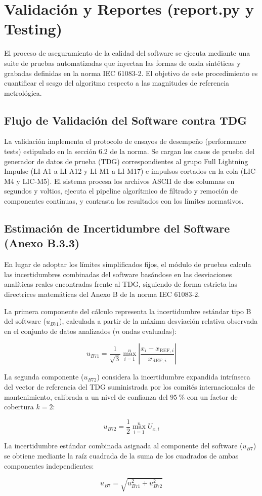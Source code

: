 \section{Validación y Reportes (report.py y Testing)}
El proceso de aseguramiento de la calidad del software se ejecuta mediante una suite de pruebas automatizadas que inyectan las formas de onda sintéticas y grabadas definidas en la norma IEC 61083-2. El objetivo de este procedimiento es cuantificar el sesgo del algoritmo respecto a las magnitudes de referencia metrológica.

\subsection{Flujo de Validación del Software contra TDG}
La validación implementa el protocolo de ensayos de desempeño (performance tests) estipulado en la sección 6.2 de la norma. Se cargan los casos de prueba del generador de datos de prueba (TDG) correspondientes al grupo Full Lightning Impulse (LI-A1 a LI-A12 y LI-M1 a LI-M17) e impulsos cortados en la cola (LIC-M4 y LIC-M5). El sistema procesa los archivos ASCII de dos columnas en segundos y voltios, ejecuta el pipeline algorítmico de filtrado y remoción de componentes continuas, y contrasta los resultados con los límites normativos.

\subsection{Estimación de Incertidumbre del Software (Anexo B.3.3)}
En lugar de adoptar los límites simplificados fijos, el módulo de pruebas calcula las incertidumbres combinadas del software basándose en las desviaciones analíticas reales encontradas frente al TDG, siguiendo de forma estricta las directrices matemáticas del Anexo B de la norma IEC 61083-2.

La primera componente del cálculo representa la incertidumbre estándar tipo B del software ($u_{B71}$), calculada a partir de la máxima desviación relativa observada en el conjunto de datos analizados ($n$ ondas evaluadas):

$$u_{B71} = \frac{1}{\sqrt{3}} \max_{i=1}^{n} \left| \frac{x_i - x_{\text{REF},i}}{x_{\text{REF},i}} \right|$$

La segunda componente ($u_{B72}$) considera la incertidumbre expandida intrínseca del vector de referencia del TDG suministrada por los comités internacionales de mantenimiento, calibrada a un nivel de confianza del $\SI{95}{\percent}$ con un factor de cobertura $k=2$:

$$u_{B72} = \frac{1}{2} \max_{i=1}^{n} U_{x,i}$$

La incertidumbre estándar combinada asignada al componente del software ($u_{B7}$) se obtiene mediante la raíz cuadrada de la suma de los cuadrados de ambas componentes independientes:

$$u_{B7} = \sqrt{u_{B71}^2 + u_{B72}^2}$$

